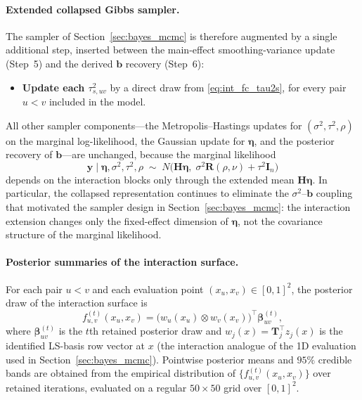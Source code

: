 \paragraph{Extended collapsed Gibbs sampler.}
The sampler of Section~\ref{sec:bayes_mcmc} is therefore augmented by a single additional
step, inserted between the main-effect smoothing-variance update (Step~5) and the derived
$\boldsymbol b$ recovery (Step~6):
\begin{itemize}
\item[\textbf{5$'$.}] \textbf{Update each $\tau^2_{s,uv}$} by a direct draw from
\eqref{eq:int_fc_tau2s}, for every pair $u<v$ included in the model.
\end{itemize}
All other sampler components---the Metropolis--Hastings updates for
$(\sigma^2,\tau^2,\rho)$ on the marginal log-likelihood, the Gaussian update for
$\boldsymbol\eta$, and the posterior recovery of $\boldsymbol b$---are unchanged, because
the marginal likelihood
\[
\boldsymbol y\mid\boldsymbol\eta,\sigma^2,\tau^2,\rho\;\sim\;
N\!\big(\mathbf H\boldsymbol\eta,\;\sigma^2\mathbf R(\rho,\nu)+\tau^2\mathbf I_n\big)
\]
depends on the interaction blocks only through the extended mean $\mathbf H\boldsymbol\eta$.
In particular, the collapsed representation continues to eliminate the
$\sigma^2$--$\boldsymbol b$ coupling that motivated the sampler design in
Section~\ref{sec:bayes_mcmc}: the interaction extension changes only the fixed-effect
dimension of $\boldsymbol\eta$, not the covariance structure of the marginal likelihood.

\paragraph{Posterior summaries of the interaction surface.}
For each pair $u<v$ and each evaluation point $(x_u,x_v)\in[0,1]^2$, the posterior draw of
the interaction surface is
\begin{equation}
f_{u,v}^{(t)}(x_u,x_v)
=\big(w_u(x_u)\otimes w_v(x_v)\big)^\top\boldsymbol\beta_{uv}^{(t)},
\label{eq:int_post_draw}
\end{equation}
where $\boldsymbol\beta_{uv}^{(t)}$ is the $t$th retained posterior draw and
$w_j(x)=\mathbf T_j^\top z_j(x)$ is the identified LS-basis row vector at $x$ (the
interaction analogue of the 1D evaluation used in Section~\ref{sec:bayes_mcmc}). Pointwise
posterior means and $95\%$ credible bands are obtained from the empirical distribution of
$\{f_{u,v}^{(t)}(x_u,x_v)\}$ over retained iterations, evaluated on a regular
$50\times 50$ grid over $[0,1]^2$.
